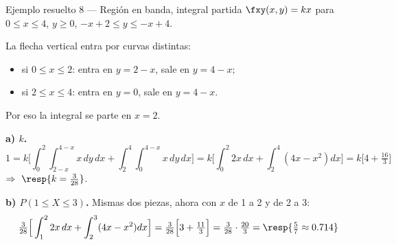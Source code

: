 \begin{ejemplo}{Ejemplo resuelto 8 --- Regi\'on en banda, integral partida }
$\fxy(x,y)=kx$ para $0\le x\le4$, $y\ge0$, $-x+2\le y\le -x+4$.

\begin{minipage}{0.36\textwidth}
\end{minipage}
\begin{minipage}{0.62\textwidth}
La flecha vertical entra por curvas distintas:
\begin{itemize}
\item si $0\le x\le2$: entra en $y=2-x$, sale en $y=4-x$;
\item si $2\le x\le4$: entra en $y=0$, sale en $y=4-x$.
\end{itemize}
Por eso la integral se parte en $x=2$.
\end{minipage}

\textbf{a) $k$.}
\[
1=k\Big[\int_0^2\!\!\int_{2-x}^{4-x}x\,dy\,dx+\int_2^4\!\!\int_0^{4-x}x\,dy\,dx\Big]
=k\Big[\int_0^2 2x\,dx+\int_2^4(4x-x^2)dx\Big]=k\Big[4+\tfrac{16}{3}\Big]
\]
$\Rightarrow\ \resp{k=\tfrac{3}{28}}$.

\textbf{b) $P(1\le X\le3)$.} Mismas dos piezas, ahora con $x$ de 1 a 2 y de 2 a 3:
\[
\tfrac{3}{28}\Big[\int_1^2 2x\,dx+\int_2^3(4x-x^2)dx\Big]=\tfrac{3}{28}\Big[3+\tfrac{11}{3}\Big]=\tfrac{3}{28}\cdot\tfrac{20}{3}=\resp{\tfrac57\approx0.714}
\]
\end{ejemplo}

